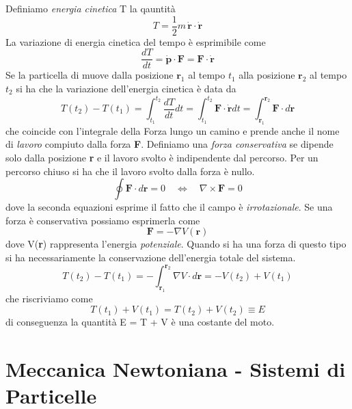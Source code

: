 Definiamo \textit{energia cinetica} T la qauntit\`{a}
\begin{equation}
	T = \frac{1}{2}m \,\dot{\bm{r}} \cdot \dot{\bm{r}} 
\end{equation}
La variazione di energia cinetica del tempo \`{e} esprimibile come
\begin{equation}
	\frac{dT}{dt} = \dot{\bm{p}} \cdot \bm{F} = \bm{F} \cdot \dot{\bm{r}}
\end{equation}
Se la particella di muove dalla posizione $\bm{r}_1$ al tempo $t_1$ alla posizione $\bm{r}_2$ al tempo $t_2$ si ha che la variazione dell'energia cinetica \`{e} data da 
\begin{equation}
T\left(t_2\right)-T\left(t_1\right)=\int_{t_1}^{t_2} \frac{d T}{d t} d t=\int_{t_1}^{t_2} \mathbf{F} \cdot \dot{\mathbf{r}} d t=\int_{\mathbf{r}_1}^{\mathbf{r}_2} \mathbf{F} \cdot d \mathbf{r}
\end{equation}
che coincide con l'integrale della Forza lungo un camino e prende anche il nome di \textit{lavoro} compiuto dalla forza \textbf{F}. Definiamo una \textit{forza conservativa} se dipende solo dalla posizione \textbf{r} e il lavoro svolto \`{e} indipendente dal percorso. Per un percorso chiuso si ha che il lavoro svolto dalla forza \`{e} nullo.
\begin{equation}
\oint \mathbf{F} \cdot d \mathbf{r}=0 \quad \Leftrightarrow \quad \nabla \times \mathbf{F}=0
\end{equation}
dove la seconda equazioni esprime il fatto che il campo \`{e} \textit{irrotazionale}. Se una forza \`{e} conservativa possiamo esprimerla come 
\begin{equation}
\mathbf{F}=-\nabla V(\mathbf{r})
\end{equation}
dove V(\textbf{r}) rappresenta l'energia \textit{potenziale}. Quando si ha una forza di questo tipo si ha necessariamente la conservazione dell'energia totale del sistema.
\begin{equation}
T\left(t_2\right)-T\left(t_1\right)=-\int_{\mathbf{r}_1}^{\mathbf{r}_2} \nabla V \cdot d \mathbf{r}=-V\left(t_2\right)+V\left(t_1\right)
\end{equation}
che riscriviamo come 
\begin{equation}
T\left(t_1\right)+V\left(t_1\right)=T\left(t_2\right)+V\left(t_2\right) \equiv E
\end{equation}
di conseguenza la quantit\`{a} E = T + V \`{e} una costante del moto.

\section{Meccanica Newtoniana - Sistemi di Particelle}


